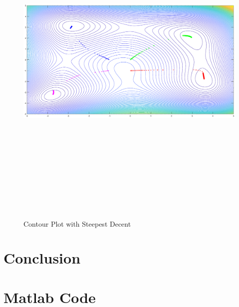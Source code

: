 \documentclass[12pt]{article}
\begin{document}
\begin{landscape}
\begin{figure}[h!]
    \centering
    \includegraphics[width=9in,height=6.5in]{SDM_Contour.eps}
    \caption{Contour Plot with Steepest Decent}
    \label{fig:SDM_Contour}
\end{figure}
\end{landscape}
\pagebreak
\section{Conclusion}

\pagebreak

\appendix
\section{Matlab Code}

\end{document}
